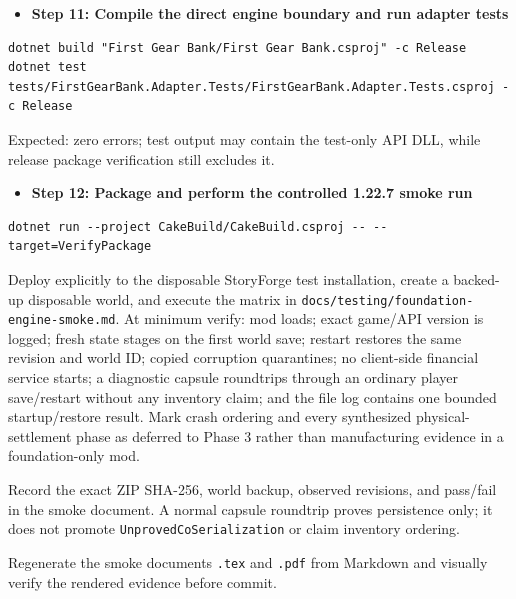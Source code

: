\documentclass[
  10pt,
  letterpaper,
]{article}
\newcommand{\passthrough}[1]{#1}
\providecommand{\tightlist}{%
  \setlength{\itemsep}{0pt}\setlength{\parskip}{0pt}}
\begin{document}
\begin{itemize}
\tightlist
\item[$\square$]
  \textbf{Step 11: Compile the direct engine boundary and run adapter
  tests}
\end{itemize}

\begin{lstlisting}
dotnet build "First Gear Bank/First Gear Bank.csproj" -c Release
dotnet test tests/FirstGearBank.Adapter.Tests/FirstGearBank.Adapter.Tests.csproj -c Release
\end{lstlisting}

Expected: zero errors; test output may contain the test-only API DLL,
while release package verification still excludes it.

\begin{itemize}
\tightlist
\item[$\square$]
  \textbf{Step 12: Package and perform the controlled 1.22.7 smoke run}
\end{itemize}

\begin{lstlisting}
dotnet run --project CakeBuild/CakeBuild.csproj -- --target=VerifyPackage
\end{lstlisting}

Deploy explicitly to the disposable StoryForge test installation, create
a backed-up disposable world, and execute the matrix in
\texttt{docs/}\allowbreak{}\texttt{testing/}\allowbreak{}\texttt{foundation-}\allowbreak{}\texttt{engine-}\allowbreak{}\texttt{smoke.}\allowbreak{}\texttt{md}.
At minimum verify: mod loads; exact game/API version is logged; fresh
state stages on the first world save; restart restores the same revision
and world ID; copied corruption quarantines; no client-side financial
service starts; a diagnostic capsule roundtrips through an ordinary
player save/restart without any inventory claim; and the file log
contains one bounded startup/restore result. Mark crash ordering and
every synthesized physical-settlement phase as deferred to Phase 3
rather than manufacturing evidence in a foundation-only mod.

Record the exact ZIP SHA-256, world backup, observed revisions, and
pass/fail in the smoke document. A normal capsule roundtrip proves
persistence only; it does not promote
\passthrough{\lstinline!UnprovedCoSerialization!} or claim inventory
ordering.

Regenerate the smoke document\textquotesingle s
\passthrough{\lstinline!.tex!} and \passthrough{\lstinline!.pdf!} from
Markdown and visually verify the rendered evidence before commit.
\end{document}
